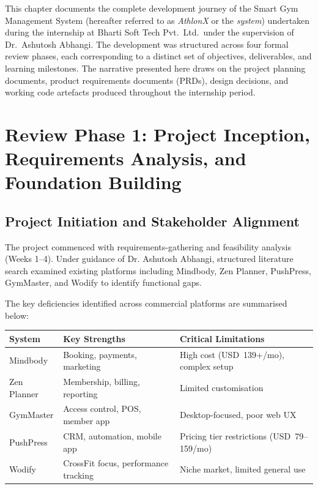\documentclass[
  12pt,
  a4paperpaper,
]{report}
\begin{document}
This chapter documents the complete development journey of the Smart
Gym Management System (hereafter referred to as \emph{AthlonX} or
the \emph{system}) undertaken during the internship at Bharti Soft
Tech Pvt.~Ltd.~under the supervision of Dr.~Ashutosh Abhangi. The
development was structured across four formal review phases, each
corresponding to a distinct set of objectives, deliverables, and
learning milestones. The narrative presented here draws on the
project planning documents, product requirements documents (PRDs),
design decisions, and working code artefacts produced throughout the
internship period.


\section{Review Phase 1: Project Inception, Requirements Analysis, and
Foundation Building}\label{review-phase-1}

\subsection{Project Initiation and Stakeholder
Alignment}\label{project-initiation}

The project commenced with requirements-gathering and feasibility analysis (Weeks 1--4). Under guidance of Dr. Ashutosh Abhangi, structured literature search examined existing platforms including Mindbody, Zen Planner, PushPress, GymMaster, and Wodify to identify functional gaps.

The key deficiencies identified across commercial platforms are
summarised below:

\vspace{4pt}
\noindent\begin{tabularx}{\textwidth}{|p{3.5cm}|p{4.0cm}|X|}
\hline
\textbf{System} & \textbf{Key Strengths} & \textbf{Critical Limitations} \\
\hline

Mindbody & Booking, payments, marketing & High cost (USD~139+/mo), complex setup \\[3pt]
\hline
Zen Planner & Membership, billing, reporting & Limited customisation \\[3pt]
\hline
GymMaster & Access control, POS, member app & Desktop-focused, poor web UX \\[3pt]
\hline
PushPress & CRM, automation, mobile app & Pricing tier restrictions (USD~79--159/mo) \\[3pt]
\hline
Wodify & CrossFit focus, performance tracking & Niche market, limited general use \\
\hline
\end{tabularx}
\vspace{4pt}
\end{document}
